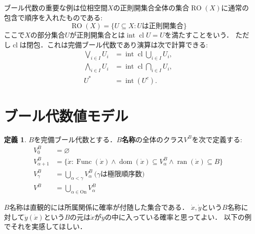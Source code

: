 \documentclass[uplatex,dvipdfmx]{jsarticle}
\newcommand{\range}{\operatorname{ran}}
\newcommand{\dom}{\operatorname{dom}}
\newcommand{\Func}{\operatorname{Func}}
\newcommand{\intr}{\operatorname{int}}
\newcommand{\cl}{\operatorname{cl}}
\newcommand{\RO}{\operatorname{RO}}
\newcommand{\Ordinals}{\mathrm{On}}
\renewcommand\emptyset{\varnothing}
\renewcommand\subset{\subseteq}
\theoremstyle{definition}
\newtheorem{defi}[thm]{定義}
\begin{document}
ブール代数の重要な例は位相空間$X$の正則開集合全体の集合$\RO(X)$に通常の包含で順序を入れたものである:
\[
\RO(X) = \{ U \subset X : \text{$U$は正則開集合} \}
\]
ここで$X$の部分集合$U$が正則開集合とは$\intr \cl U = U$を満たすことをいう．
ただし$\cl$は閉包．これは完備ブール代数であり演算は次で計算できる:
\begin{align*}
\bigvee_{i \in I} U_i &= \intr \cl \bigcup_{i \in I} U_i, \\
\bigwedge_{i \in I} U_i &= \intr \cl  \bigcap_{i \in I} U_i, \\
U^* &= \intr (U^c).
\end{align*}

\section{ブール代数値モデル}

\begin{defi}
$B$を完備ブール代数とする．{\bfseries $B$名称}の全体のクラス$V^B$を次で定義する:
\begin{align*}
V^B_0 &= \emptyset \\
V^B_{\alpha + 1} &= \{ \dot{x} : \Func(\dot{x}) \land \dom(\dot{x}) \subset V^B_\alpha \land \range(\dot{x}) \subset B \} \\
V^B_{\gamma} &= \bigcup_{\alpha < \gamma} V^B_\alpha \ \text{($\gamma$は極限順序数)} \\
V^B &= \bigcup_{\alpha \in \Ordinals} V^B_\alpha
\end{align*}
\end{defi}

$B$名称は直観的には所属関係に確率が付随した集合である．
$\dot{x}, \dot{y}$という$B$名称に対して$\dot{y}(\dot{x})$という$B$の元は$\dot{x}$が$\dot{y}$の中に入っている確率と思ってよい．
以下の例でそれを実感してほしい．
\end{document}
